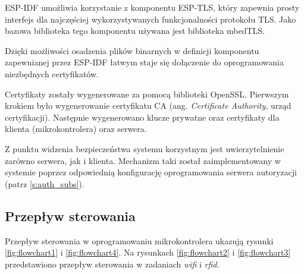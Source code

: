             ESP-IDF umożliwia korzystanie z komponentu ESP-TLS, który zapewnia prosty interfejs dla najczęściej wykorzystywanych funkcjonalności protokołu TLS. Jako bazowa biblioteka tego komponentu używana jest biblioteka mbedTLS.

            Dzięki możliwości osadzenia plików binarnych w definicji komponentu zapewnianej przez ESP-IDF łatwym staje się dołączenie do oprogramowania niezbędnych certyfikatów.

            Certyfikaty zostały wygenerowane za pomocą biblioteki OpenSSL. Pierwszym krokiem było wygenerowanie certyfikatu CA (ang. \textit{Certificate Authority}, urząd certyfikacji). Następnie wygenerowano klucze prywatne oraz certyfikaty dla klienta (mikrokontrolera) oraz serwera.

            Z punktu widzenia bezpieczeństwa systemu korzystnym jest uwierzytelnienie zarówno serwera, jak i klienta. Mechanizm taki został zaimplementowany w systemie poprzez odpowiednią konfigurację oprogramowania serwera autoryzacji (patrz \ref{s:auth_subs}).

        \subsection{Przepływ sterowania}

            Przepływ sterowania w oprogramowaniu mikrokontrolera ukazują rysunki \ref{fig:flowchart1} i \ref{fig:flowchart4}. Na rysunkach \ref{fig:flowchart2} i \ref{fig:flowchart3} przedstawiono przepływ sterowania w zadaniach \textit{wifi} i \textit{rfid}.

